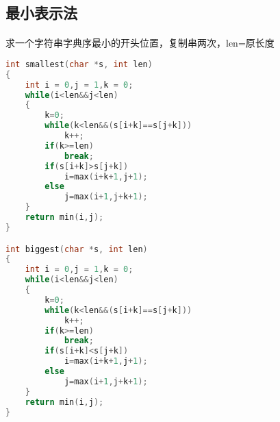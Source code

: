 ﻿\subsection{最小表示法}
\paragraph{}
求一个字符串字典序最小的开头位置，复制串两次，len=原长度
\begin{lstlisting}[language=C++]
int smallest(char *s, int len) 
{
    int i = 0,j = 1,k = 0;
    while(i<len&&j<len)
    {
        k=0;
        while(k<len&&(s[i+k]==s[j+k]))
            k++;
        if(k>=len)
            break;
        if(s[i+k]>s[j+k])
            i=max(i+k+1,j+1);
        else
            j=max(i+1,j+k+1);
    }
    return min(i,j);
} 

int biggest(char *s, int len) 
{
    int i = 0,j = 1,k = 0;
    while(i<len&&j<len)
    {
        k=0;
        while(k<len&&(s[i+k]==s[j+k]))
            k++;
        if(k>=len)
            break;
        if(s[i+k]<s[j+k])
            i=max(i+k+1,j+1);
        else
            j=max(i+1,j+k+1);
    }
    return min(i,j);
} 

\end{lstlisting}
